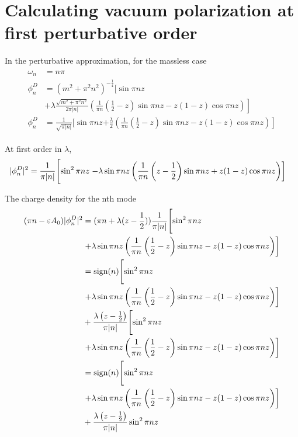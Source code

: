 \chapter{Calculating vacuum polarization at first perturbative order}
In the perturbative approximation, for the massless case
\begin{align}
	\begin{split}
		\omega_n &= n \pi \\
	\phi_n^{D} &= \left( m^2 + \pi^2  n^2 \right)^{-\frac{1}{4}} \Biggl[ \sin\pi n z \\
		   &\left.+ \lambda \frac{\sqrt{m^2 + \pi^2 n^2} }{2 \pi \lvert n \rvert} 
		\left( 
		\frac{1}{\pi n}\left( \frac{1}{2} - z \right) \sin \pi n z - z(1-z) \cos \pi n z \right) 
	\right]  \\
	\phi_n^{D} &= \frac{1}{\sqrt{\pi \lvert n \rvert}}  \Biggl[ \sin\pi n z 
		   \left.+ \frac{\lambda}{2}		\left( 
		\frac{1}{\pi n}\left( \frac{1}{2} - z \right) \sin \pi n z - z(1-z) \cos \pi n z \right) 
	\right] 
	\end{split} 
\end{align}

At first order in $\lambda$, 
\begin{align}
	\lvert \phi_n^{D}\rvert^2 &= \frac{1}{\pi \abs{n}} \Biggl[ \sin^2\pi n z 
		   \left.- \lambda \sin \pi n z		\left( 
		\frac{1}{\pi n}\left( z - \frac{1}{2} \right) \sin \pi n z + z(1-z) \cos \pi n z \right) 
	\right] 
\end{align}

The charge density for the nth mode
\begin{align*}
	(\pi n - \varepsilon A_0)	\lvert \phi_n^{D}\rvert^2 &= (\pi n + \lambda (z-\frac{1}{2}) )\frac{1}{\pi \abs{n}}  \Biggl[ \sin^2\pi n z  \\
									  & \left.+ \lambda \sin \pi n z		\left( 
			\frac{1}{\pi n}\left( \frac{1}{2} - z \right) \sin \pi n z - z(1-z) \cos \pi n z \right) 
		\right]  \\
&= \text{sign}(n)\Biggl[ \sin^2\pi n z  \\
									  & \left.+ \lambda \sin \pi n z		\left( 
			\frac{1}{\pi n}\left( \frac{1}{2} - z \right) \sin \pi n z - z(1-z) \cos \pi n z \right) 
		\right] \\
									  &+\frac{ \lambda \left( z-\frac{1}{2} \right) }{\pi \abs{n} }
\Biggl[ \sin^2\pi n z  \\
									  & \left.+ \lambda \sin \pi n z		\left( 
			\frac{1}{\pi n}\left( \frac{1}{2} - z \right) \sin \pi n z - z(1-z) \cos \pi n z \right) 
		\right] \\
&= \text{sign}(n)\Biggl[ \sin^2\pi n z  \\
									  & \left.+ \lambda \sin \pi n z		\left( 
			\frac{1}{\pi n}\left( \frac{1}{2} - z \right) \sin \pi n z - z(1-z) \cos \pi n z \right) 
		\right] \\
									  &+ \frac{\lambda \left( z-\frac{1}{2} \right)}{\pi \abs{n}}
\sin^2\pi n z  
\end{align*}

